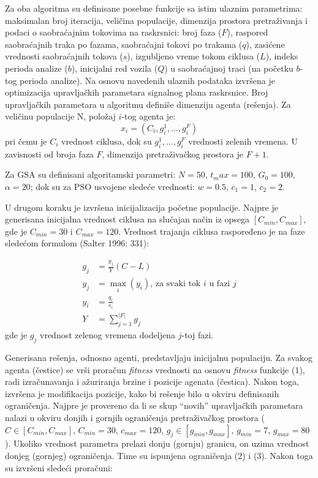 Za oba algoritma su definisane posebne funkcije sa istim ulaznim parametrima: maksimalan broj iteracija, veličina populacije, dimenzija prostora pretraživanja i podaci o saobraćajnim tokovima na raskrsnici: broj faza ($F$), raspored saobraćajnih traka po fazama, saobraćajni tokovi po trakama ($q$), zasićene vrednosti saobraćajnih tokova ($s$), izgubljeno vreme tokom ciklusa ($L$), indeks perioda analize ($b$), inicijalni red vozila ($Q$) u saobraćajnoj traci (na početku $b$-tog perioda analize). Na osnovu navedenih ulaznih podataka izvršena je optimizacija upravljačkih parametara signalnog plana raskrsnice. Broj upravljačkih parametara u algoritmu definiše dimenziju agenta (rešenja). Za veličinu populacije N, položaj $i$-tog agenta je:
\begin{equation*}
    x_i = \left(C_i, g_i^1, \dots, g_i^F\right)
\end{equation*}
pri čemu je $C_i$ vrednost ciklusa, dok su $g_i^1,\dots,g_i^F$ vrednosti zelenih vremena. U zavisnosti od broja faza $F$, dimenzija pretraživačkog prostora je $F+1$.

Za GSA su definisani algoritamski parametri: $N=50$, $t_max = 100$, $G_0 = 100$, $\alpha = 20$; dok su za PSO usvojene sledeće vrednosti: $w = 0.5$, $c_1 = 1$, $c_2 = 2$.

U drugom koraku je izvršena inicijalizacija početne populacije. Najpre je generisana inicijalna vrednost ciklusa na slučajan način iz opsega $[C_{min}, C_{max}]$, gde je $C_{min} = 30$ i $C_{max} = 120$. Vrednost trajanja ciklusa raspoređeno je na faze sledećom formulom (Salter 1996: 331):

\begin{align*}
    g_j & = \frac{y_j}{Y} (C - L) \\
    y_j & = \max_i (y_i)\mbox{, za svaki tok $i$ u fazi $j$} \\
    y_i & = \frac{q_i}{s_i} \\
    Y & = \sum_{j=1}^{|F|}g_j
\end{align*}
gde je $g_j$ vrednost zelenog vremena dodeljena $j$-toj fazi. 

Generisana rešenja, odnosno agenti, predstavljaju inicijalnu populaciju. Za svakog agenta (čestice) se vrši proračun \emph{fitness} vrednosti na osnovu \emph{fitness} funkcije (1), radi izračunavanja i ažuriranja brzine i pozicije agenata (čestica). Nakon toga, izvršena je modifikacija pozicije, kako bi rešenje bilo u okviru definisanih ograničenja. Najpre je provereno da li se skup “novih” upravljačkih parametara nalazi u okviru donjih i gornjih ograničenja pretraživačkog prostora ($C \in [C_{min}, C_{max}]$, $C_{min}=30$, $c_{max}=120$, $g_j \in [g_{min}, g_{max}]$, $g_{min}=7$, $g_{max}=80$). Ukoliko vrednost parametra prelazi donju (gornju) granicu, on uzima vrednost donjeg (gornjeg) ograničenja. Time su ispunjena ograničenja (2) i (3). Nakon toga su izvršeni sledeći proračuni:


